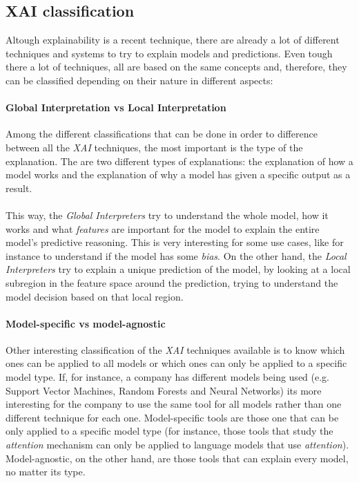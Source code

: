 \subsection{XAI classification}
\noindent Altough explainability is a recent technique, there are already a lot of different techniques and systems to try to explain models and predictions. Even tough there a lot of techniques, all are based on the same concepts and, therefore, they can be classified depending on their nature in different aspects:
\paragraph{Global Interpretation vs Local Interpretation} Among the different classifications that can be done in order to difference between all the \emph{XAI} techniques, the most important is the type of the explanation. The are two different types of explanations: the explanation of how a model works and the explanation of why a model has given a specific output as a result. 
\paragraph{}
This way, the \emph{Global Interpreters} try to understand the whole model, how it works and what \emph{features} are important for the model to explain the entire model's predictive reasoning. This is very interesting for some use cases, like for instance to understand if the model has some \emph{bias}. On the other hand, the \emph{Local Interpreters} try to explain a unique prediction of the model, by looking at a local subregion in the feature space around the prediction, trying to understand the model decision based on that local region.
\paragraph{Model-specific vs model-agnostic} Other interesting classification of the \emph{XAI} techniques available is to know which ones can be applied to all models or which ones can only be applied to a specific model type. If, for instance, a company has different models being used (e.g. Support Vector Machines, Random Forests and Neural Networks) its more interesting for the company to use the same tool for all models rather than one different technique for each one. Model-specific tools are those one that can be only applied to a specific model type (for instance, those tools that study the \emph{attention} mechanism can only be applied to language models that use \emph{attention}). Model-agnostic, on the other hand, are those tools that can explain every model, no matter its type.
